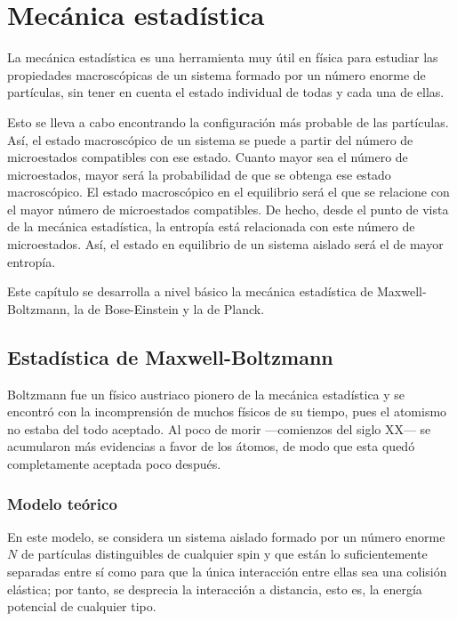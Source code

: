 %

\chapter{Mecánica estadística}
La mecánica estadística es una herramienta muy útil en física para estudiar
las propiedades macroscópicas de un sistema formado por un número enorme de
partículas, sin tener en cuenta el estado individual de todas y cada una de
ellas.

Esto se lleva a cabo encontrando la configuración más probable de las
partículas. Así, el estado macroscópico de un sistema se puede a partir del
número de microestados compatibles con ese estado.
Cuanto mayor sea el número de microestados, mayor será la probabilidad de que
se obtenga ese estado macroscópico. El estado macroscópico en el equilibrio
será el que se relacione con el mayor número de microestados compatibles.
De hecho, desde el punto de vista de la mecánica estadística, la entropía está
relacionada con este número de microestados. Así, el estado en equilibrio de un
sistema aislado será el de mayor entropía.

Este capítulo se desarrolla a nivel básico la mecánica estadística
de Maxwell-Boltzmann, la de Bose-Einstein y la de Planck.

\section{Estadística de Maxwell-Boltzmann}
Boltzmann fue un físico austriaco pionero de la mecánica estadística y se
encontró con la incomprensión de muchos físicos de su tiempo, pues el
atomismo no estaba del todo aceptado. Al poco de morir ---comienzos del siglo
XX--- se acumularon más evidencias a favor de los átomos, de modo que esta
quedó completamente aceptada poco después.

\subsection{Modelo teórico}
En este modelo, se considera un sistema aislado formado por un número enorme
$N$ de partículas distinguibles de cualquier spin y que están lo
suficientemente separadas entre sí como para que la única interacción entre
ellas sea una colisión elástica; por tanto, se desprecia la interacción a
distancia, esto es, la energía potencial de cualquier tipo.

